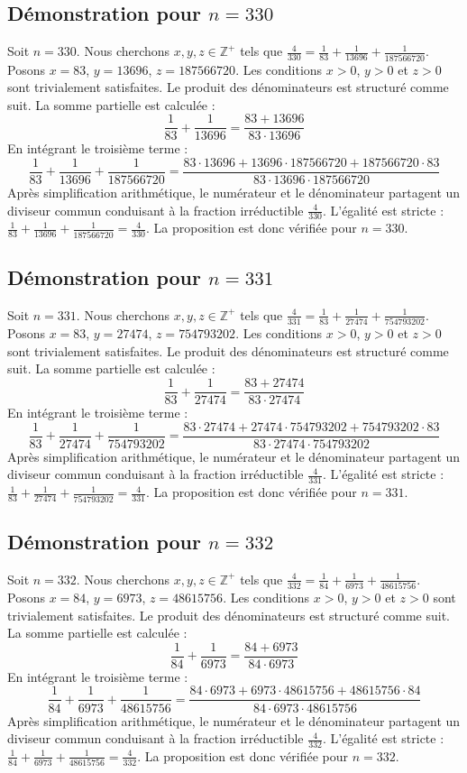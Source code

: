 \documentclass[11pt,a4paper]{article}
\begin{document}
\subsection{Démonstration pour $n = 330$}
Soit $n = 330$. Nous cherchons $x, y, z \in \mathbb{Z}^{+}$ tels que $\frac{4}{330} = \frac{1}{83} + \frac{1}{13696} + \frac{1}{187566720}$.
Posons $x = 83$, $y = 13696$, $z = 187566720$.
Les conditions $x > 0$, $y > 0$ et $z > 0$ sont trivialement satisfaites.
Le produit des dénominateurs est structuré comme suit. La somme partielle est calculée :
$$ \frac{1}{83} + \frac{1}{13696} = \frac{83+13696}{83 \cdot 13696} $$
En intégrant le troisième terme :
$$ \frac{1}{83} + \frac{1}{13696} + \frac{1}{187566720} = \frac{83 \cdot 13696 + 13696 \cdot 187566720 + 187566720 \cdot 83}{83 \cdot 13696 \cdot 187566720} $$
Après simplification arithmétique, le numérateur et le dénominateur partagent un diviseur commun conduisant à la fraction irréductible $\frac{4}{330}$.
L'égalité est stricte : $\frac{1}{83} + \frac{1}{13696} + \frac{1}{187566720} = \frac{4}{330}$.
La proposition est donc vérifiée pour $n = 330$.
\subsection{Démonstration pour $n = 331$}
Soit $n = 331$. Nous cherchons $x, y, z \in \mathbb{Z}^{+}$ tels que $\frac{4}{331} = \frac{1}{83} + \frac{1}{27474} + \frac{1}{754793202}$.
Posons $x = 83$, $y = 27474$, $z = 754793202$.
Les conditions $x > 0$, $y > 0$ et $z > 0$ sont trivialement satisfaites.
Le produit des dénominateurs est structuré comme suit. La somme partielle est calculée :
$$ \frac{1}{83} + \frac{1}{27474} = \frac{83+27474}{83 \cdot 27474} $$
En intégrant le troisième terme :
$$ \frac{1}{83} + \frac{1}{27474} + \frac{1}{754793202} = \frac{83 \cdot 27474 + 27474 \cdot 754793202 + 754793202 \cdot 83}{83 \cdot 27474 \cdot 754793202} $$
Après simplification arithmétique, le numérateur et le dénominateur partagent un diviseur commun conduisant à la fraction irréductible $\frac{4}{331}$.
L'égalité est stricte : $\frac{1}{83} + \frac{1}{27474} + \frac{1}{754793202} = \frac{4}{331}$.
La proposition est donc vérifiée pour $n = 331$.
\subsection{Démonstration pour $n = 332$}
Soit $n = 332$. Nous cherchons $x, y, z \in \mathbb{Z}^{+}$ tels que $\frac{4}{332} = \frac{1}{84} + \frac{1}{6973} + \frac{1}{48615756}$.
Posons $x = 84$, $y = 6973$, $z = 48615756$.
Les conditions $x > 0$, $y > 0$ et $z > 0$ sont trivialement satisfaites.
Le produit des dénominateurs est structuré comme suit. La somme partielle est calculée :
$$ \frac{1}{84} + \frac{1}{6973} = \frac{84+6973}{84 \cdot 6973} $$
En intégrant le troisième terme :
$$ \frac{1}{84} + \frac{1}{6973} + \frac{1}{48615756} = \frac{84 \cdot 6973 + 6973 \cdot 48615756 + 48615756 \cdot 84}{84 \cdot 6973 \cdot 48615756} $$
Après simplification arithmétique, le numérateur et le dénominateur partagent un diviseur commun conduisant à la fraction irréductible $\frac{4}{332}$.
L'égalité est stricte : $\frac{1}{84} + \frac{1}{6973} + \frac{1}{48615756} = \frac{4}{332}$.
La proposition est donc vérifiée pour $n = 332$.
\end{document}
